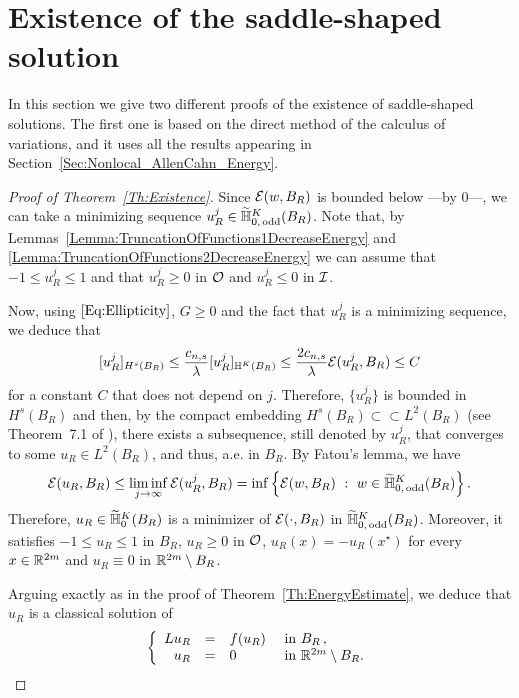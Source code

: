 \section{Existence of the saddle-shaped solution}
\label{Sec:Existence}


In this section we give two different proofs of the existence of saddle-shaped solutions. The first one is based on the direct method of the calculus of variations, and it uses all the results appearing in Section~\ref{Sec:Nonlocal_AllenCahn_Energy}.

\begin{proof}[Proof of Theorem~\ref{Th:Existence}]
Since $\mathcal{E}(w,B_R)$ is bounded below ---by $0$---, we can take a minimizing sequence $u_R^j\in \widetilde{\mathbb{H}}^K_{0, \,\mathrm{odd}}(B_R)$. Note that, by Lemmas~\ref{Lemma:TruncationOfFunctions1DecreaseEnergy} and \ref{Lemma:TruncationOfFunctions2DecreaseEnergy} we can assume that $-1 \leq u_R^j \leq 1$ and that $u_R^j \geq 0$ in $\mathcal{O}$ and $u_R^j \leq 0$ in $\mathcal{I}$. 

Now, using $\eqref{Eq:Ellipticity}$, $G\geq 0$ and the fact that $u_R^j$ is a minimizing sequence, we deduce that 
$$
[u_R^j]_{H^s(B_R)} \leq \dfrac{c_{n,s}}{\lambda}  [u_R^j]_{\mathbb{H}^K(B_R)}\leq \dfrac{2 c_{n,s}}{\lambda}\mathcal{E}(u_R^j,B_R) \leq C
$$
for a constant $C$ that does not depend on $j$. Therefore, $\{u_R^j\}$ is bounded in $H^s(B_R)$ and then, by the compact embedding $H^s(B_R) \subset \subset L^2(B_R)$ (see Theorem~7.1 of \cite{HitchhikerGuide}), there exists a subsequence, still denoted by $u_R^j$,  that converges to some $u_R \in L^2(B_R)$, and thus, a.e. in $B_R$. By Fatou's lemma, we have
$$
\mathcal{E}(u_R, B_R)
\leq \liminf_{j\to \infty} \mathcal{E}(u_R^j, B_R) = \inf \left \{ \mathcal{E}(w, B_R) \ : \ w \in \widetilde{\mathbb{H}}^K_{0, \,\mathrm{odd}}(B_R) \right \}.
$$
Therefore, $u_R \in \widetilde{\mathbb{H}}^K_0(B_R)$ is a minimizer of $\mathcal{E}(\cdot, B_R)$ in $\widetilde{\mathbb{H}}^K_{0, \,\mathrm{odd}}(B_R)$. Moreover, it satisfies $-1\leq u_R \leq 1$ in $B_R$, $u_R\geq 0$ in $\mathcal{O}$, $u_R(x) = - u_R(x^\star)$ for every $x\in \mathbb{R}^{2m}$ and $u_R \equiv 0 $ in $\mathbb{R}^{2m} \setminus B_R$.

Arguing exactly as in the proof of Theorem~\ref{Th:EnergyEstimate}, we deduce that $u_R$ is a classical solution of
\begin{equation}
\label{Eq:ProofExistenceProblemBR}
	\left\{\begin{array}{rcll}
	L u_R &=& f(u_R) & \textrm{ in } B_R\,,\\
	u_R &=& 0 & \textrm{ in }\mathbb{R}^{2m} \setminus B_R.
	\end{array} \right.
\end{equation}



\end{proof}
